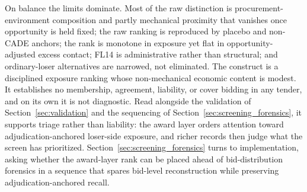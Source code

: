 On balance the limits dominate. Most of the raw distinction is
procurement-environment composition and partly mechanical proximity
that vanishes once opportunity is held fixed; the raw ranking is
reproduced by placebo and non-CADE anchors; the rank is monotone in
exposure yet flat in opportunity-adjusted excess contact; FL14 is
administrative rather than structural; and ordinary-loser alternatives
are narrowed, not eliminated. The construct is a disciplined exposure
ranking whose non-mechanical economic content is modest. It establishes
no membership, agreement, liability, or cover bidding in any tender,
and on its own it is not diagnostic. Read alongside the validation of
Section~\ref{sec:validation} and the sequencing of
Section~\ref{sec:screening_forensics}, it supports triage rather than
liability: the award layer orders attention toward
adjudication-anchored loser-side exposure, and richer records then
judge what the screen has prioritized.
Section~\ref{sec:screening_forensics} turns to implementation, asking
whether the award-layer rank can be placed ahead of bid-distribution
forensics in a sequence that spares bid-level reconstruction while
preserving adjudication-anchored recall.
